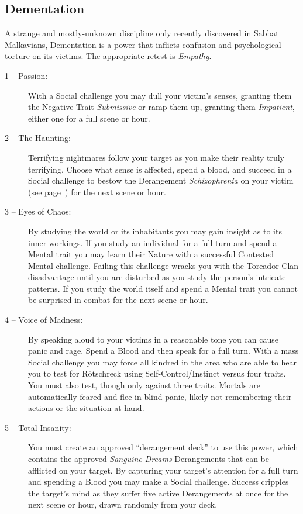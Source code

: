 \subsection{Dementation}
A strange and mostly-unknown discipline only recently discovered in Sabbat Malkavians, 
Dementation is a power that inflicts confusion and psychological torture on its 
victims.  The appropriate retest is \emph{Empathy}.

\begin{description}
	\item[1 -- Passion:]  With a Social challenge you may dull your victim's senses, 
	granting them the Negative Trait \emph{Submissive} or ramp them up, granting them 
	\emph{Impatient}, either one for a full scene or hour.
	\item[2 -- The Haunting:]  Terrifying nightmares follow your target as you make their 
	reality truly terrifying.  Choose what sense is affected, spend a blood, and succeed 
	in a Social challenge to bestow the Derangement \emph{Schizophrenia} on your victim 
	(see page~\pageref{sec:derangements}) for the next scene or hour.
	\item[3 -- Eyes of Chaos:]  By studying the world or its inhabitants you may gain 
	insight as to its inner workings.  If you study an individual for a full turn and spend 
	a Mental trait you may learn their Nature with a successful Contested Mental challenge.  
	Failing this challenge wracks you with the Toreador Clan disadvantage until you are 
	disturbed as you study the person's intricate patterns. If you study the world itself 
	and spend a Mental trait you cannot be surprised in combat for the next scene or hour.
	\item[4 -- Voice of Madness:]  By speaking aloud to your victims in a reasonable 
	tone you can cause panic and rage.  Spend a Blood and then speak for a full turn.  
	With a mass Social challenge you may force all kindred in the area who are able to hear 
	you to test for R\"{o}tschreck using Self-Control/Instinct versus four traits.  You must also 
	test, though only against three traits.  Mortals are automatically feared and flee in blind 
	panic, likely not remembering their actions or the situation at hand.
	\item[5 -- Total Insanity:]  You must create an approved ``derangement deck'' to use this 
	power, which contains the approved \emph{Sanguine Dreams} Derangements that can be afflicted 
	on your target.  By capturing your target's attention for a full turn and spending a Blood you 
	may make a Social challenge.  Success cripples the target's mind as they suffer 
	five active Derangements at once for the next scene or hour, drawn randomly 
	from your deck.
\end{description}

